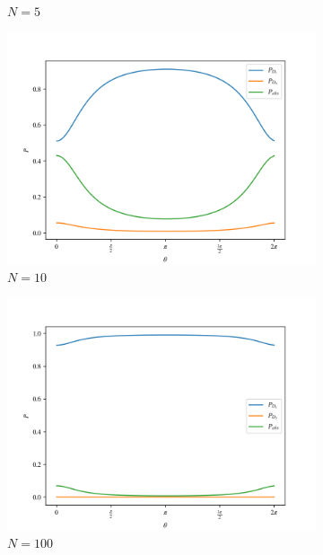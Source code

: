 \documentclass{book}
\begin{document}
\begin{figure}[H]
\begin{subfigure}[b]{0.30\linewidth}
\caption{$N=5$ }
\label{fig:BS1}
\end{subfigure}
\begin{subfigure}[b]{0.30\linewidth}
\includegraphics[width=\linewidth]{images/Azuma_phases10.png}
\caption{$N=10$ }
\label{fig:BS1}
\end{subfigure}
\begin{subfigure}[b]{0.30\linewidth}
\includegraphics[width=\linewidth]{images/Azuma_phases100.png}
\caption{$N=100$}
\end{subfigure}
\begin{subfigure}[b]{0.30\linewidth}

\end{subfigure}
\end{figure}
\end{document}

